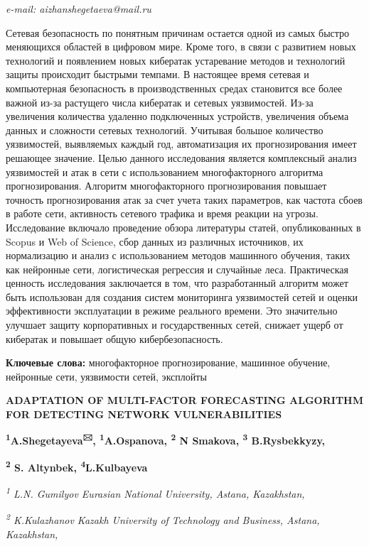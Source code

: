 \documentclass[
]{article}
\begin{document}
\emph{e-mail: aizhanshegetaeva@mail.ru}

Сетевая безопасность по понятным причинам остается одной из самых быстро
меняющихся областей в цифровом мире. Кроме того, в связи с развитием
новых технологий и появлением новых кибератак устаревание методов и
технологий защиты происходит быстрыми темпами. В настоящее время сетевая
и компьютерная безопасность в производственных средах становится все
более важной из-за растущего числа кибератак и сетевых уязвимостей.
Из-за увеличения количества удаленно подключенных устройств, увеличения
объема данных и сложности сетевых технологий. Учитывая большое
количество уязвимостей, выявляемых каждый год, автоматизация их
прогнозирования имеет решающее значение. Целью данного исследования
является комплексный анализ уязвимостей и атак в сети с использованием
многофакторного алгоритма прогнозирования. Алгоритм многофакторного
прогнозирования повышает точность прогнозирования атак за счет учета
таких параметров, как частота сбоев в работе сети, активность сетевого
трафика и время реакции на угрозы. Исследование включало проведение
обзора литературы статей, опубликованных в Scopus и Web of Science, сбор
данных из различных источников, их нормализацию и анализ с
использованием методов машинного обучения, таких как нейронные сети,
логистическая регрессия и случайные леса. Практическая ценность
исследования заключается в том, что разработанный алгоритм может быть
использован для создания систем мониторинга уязвимостей сетей и оценки
эффективности эксплуатации в режиме реального времени. Это значительно
улучшает защиту корпоративных и государственных сетей, снижает ущерб от
кибератак и повышает общую кибербезопасность.

\textbf{Ключевые слова:} многофакторное прогнозирование, машинное
обучение, нейронные сети, уязвимости сетей, эксплойты

\textbf{ADAPTATION OF MULTI-FACTOR FORECASTING ALGORITHM FOR DETECTING
NETWORK VULNERABILITIES}

\textbf{\textsuperscript{1}A.Shegetayeva\textsuperscript{🖂},
\textsuperscript{1}A.Ospanova, \textsuperscript{2} N Smakova,
\textsuperscript{3} B.Rysbekkyzy,}

\textbf{\textsuperscript{2} S. Altynbek, \textsuperscript{4}L.Kulbayeva}

\emph{\textsuperscript{1} L.N. Gumilyov Eurasian National University,
Astana, Kazakhstan,}

\emph{\textsuperscript{2} K.Kulazhanov Kazakh University of Technology
and Business, Astana, Kazakhstan,}
\end{document}
